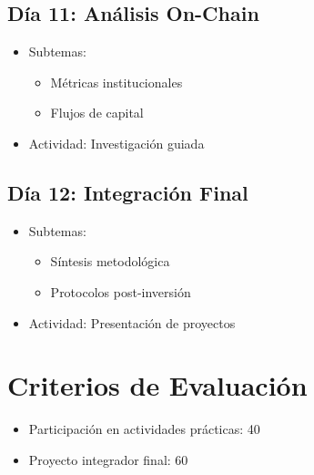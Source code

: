 \documentclass{article}
\begin{document}
\subsection*{Día 11: Análisis On-Chain}
\begin{itemize}
    \item Subtemas:
    \begin{itemize}
        \item Métricas institucionales
        \item Flujos de capital
    \end{itemize}
    \item Actividad: Investigación guiada
\end{itemize}

\subsection*{Día 12: Integración Final}
\begin{itemize}
    \item Subtemas:
    \begin{itemize}
        \item Síntesis metodológica
        \item Protocolos post-inversión
    \end{itemize}
    \item Actividad: Presentación de proyectos
\end{itemize}

\section{Criterios de Evaluación}
\begin{itemize}
    \item Participación en actividades prácticas: 40%
    \item Proyecto integrador final: 60%
\end{itemize}
\end{document}
